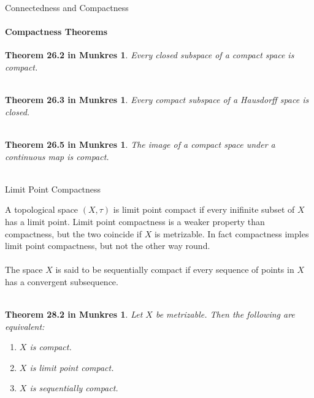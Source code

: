 \documentclass[pdf]{beamer}
\begin{document}
    \begin{frame}{Connectedness and Compactness}
        \framesubtitle{Compactness Theorems}
        \newtheorem{thrm:closedSub}{Theorem 26.2 in Munkres}
        \newtheorem{thrm:closedComp}{Theorem 26.3 in Munkres}
        \newtheorem{thrm:imageComp}{Theorem 26.5 in Munkres}

        \begin{thrm:closedSub}
            Every closed subspace of a compact space is compact. \\~\\
        \end{thrm:closedSub}

        \begin{thrm:closedComp}
            Every compact subspace of a Hausdorff space is closed. \\~\\
        \end{thrm:closedComp}

        \begin{thrm:imageComp}
            The image of a compact space under a continuous map is compact. \\~\\
        \end{thrm:imageComp}

    \end{frame}

    \begin{frame}{Limit Point Compactness}
        \newtheorem{thrm:seqComp}{Theorem 28.2 in Munkres}

        A topological space $(X, \tau)$ is {\color{red} limit point compact} if every
        inifinite subset of $X$ has a limit point. Limit point compactness is a weaker
        property than compactness, but the two coincide if $X$ is metrizable. In fact
        compactness imples limit point compactness, but not the other way round. \\~\\

        The space $X$ is said to be {\color{red} sequentially compact} if every sequence
        of points in $X$ has a convergent subsequence. \\~\\

        \begin{thrm:seqComp}
            Let $X$ be metrizable. Then the following are equivalent:
            \begin{enumerate}
                \item $X$ is compact.
                \item $X$ is limit point compact.
                \item $X$ is sequentially compact.
            \end{enumerate}
        \end{thrm:seqComp}
        
    \end{frame}
\end{document}
